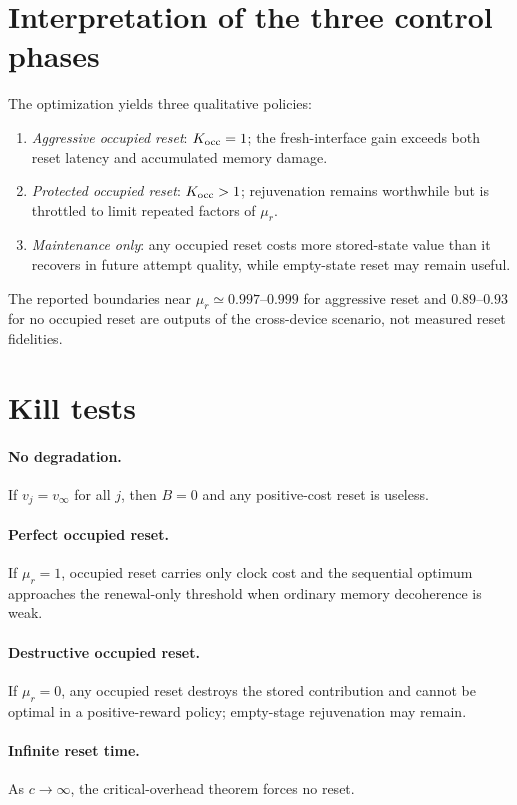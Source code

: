 \documentclass[aps,prx,preprint,superscriptaddress,nofootinbib,longbibliography]{revtex4-2}
\begin{document}
\section{Interpretation of the three control phases}
The optimization yields three qualitative policies:
\begin{enumerate}
\item \emph{Aggressive occupied reset}: $K_{\rm occ}=1$; the fresh-interface gain exceeds both reset latency and accumulated memory damage.
\item \emph{Protected occupied reset}: $K_{\rm occ}>1$; rejuvenation remains worthwhile but is throttled to limit repeated factors of $\mu_r$.
\item \emph{Maintenance only}: any occupied reset costs more stored-state value than it recovers in future attempt quality, while empty-state reset may remain useful.
\end{enumerate}
The reported boundaries near $\mu_r\simeq0.997$--$0.999$ for aggressive reset and $0.89$--$0.93$ for no occupied reset are outputs of the cross-device scenario, not measured reset fidelities.

\section{Kill tests}
\paragraph{No degradation.} If $v_j=v_\infty$ for all $j$, then $B=0$ and any positive-cost reset is useless.

\paragraph{Perfect occupied reset.} If $\mu_r=1$, occupied reset carries only clock cost and the sequential optimum approaches the renewal-only threshold when ordinary memory decoherence is weak.

\paragraph{Destructive occupied reset.} If $\mu_r=0$, any occupied reset destroys the stored contribution and cannot be optimal in a positive-reward policy; empty-stage rejuvenation may remain.

\paragraph{Infinite reset time.} As $c\to\infty$, the critical-overhead theorem forces no reset.
\end{document}
